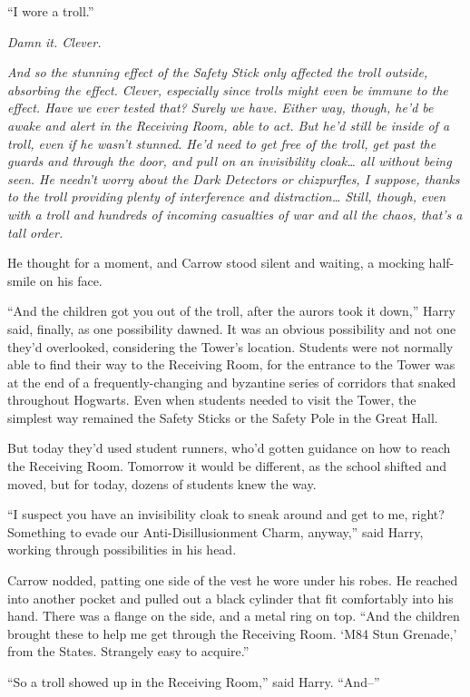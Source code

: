 ``I wore a troll.''

\emph{Damn it. Clever.}

\emph{And so the stunning effect of the Safety Stick only affected the
troll outside, absorbing the effect. Clever, especially since trolls
might even be immune to the effect. Have we ever tested that? Surely we
have. Either way, though, he'd be awake and alert in the Receiving Room,
able to act. But he'd still be inside of a troll, even if he wasn't
stunned. He'd need to get free of the troll, get past the guards and
through the door, and pull on an invisibility cloak\ldots{} all without
being seen. He needn't worry about the Dark Detectors or chizpurfles, I
suppose, thanks to the troll providing plenty of interference and
distraction\ldots{} Still, though, even with a troll and hundreds of
incoming casualties of war and all the chaos, that's a tall order.}

He thought for a moment, and Carrow stood silent and waiting, a mocking
half-smile on his face.

``And the children got you out of the troll, after the aurors took it
down,'' Harry said, finally, as one possibility dawned. It was an
obvious possibility and not one they'd overlooked, considering the
Tower's location. Students were not normally able to find their way to
the Receiving Room, for the entrance to the Tower was at the end of a
frequently-changing and byzantine series of corridors that snaked
throughout Hogwarts. Even when students needed to visit the Tower, the
simplest way remained the Safety Sticks or the Safety Pole in the Great
Hall.

But today they'd used student runners, who'd gotten guidance on how to
reach the Receiving Room. Tomorrow it would be different, as the school
shifted and moved, but for today, dozens of students knew the way.

``I suspect you have an invisibility cloak to sneak around and get to
me, right? Something to evade our Anti-Disillusionment Charm, anyway,''
said Harry, working through possibilities in his head.

Carrow nodded, patting one side of the vest he wore under his robes. He
reached into another pocket and pulled out a black cylinder that fit
comfortably into his hand. There was a flange on the side, and a metal
ring on top. ``And the children brought these to help me get through the
Receiving Room. `M84 Stun Grenade,' from the States. Strangely easy to
acquire.''

``So a troll showed up in the Receiving Room,'' said Harry. ``And--''

